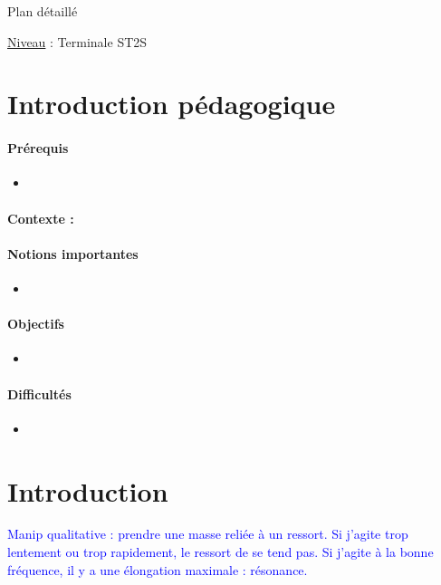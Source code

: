 \begin{reportBlock}{Plan détaillé}

\underline{Niveau} : Terminale ST2S \\

\section*{Introduction pédagogique}


\paragraph*{Prérequis}
\begin{itemize}
\item
\end{itemize}
\paragraph*{Contexte :}


\paragraph*{Notions importantes}

\begin{itemize}
\item 
\end{itemize}

\paragraph*{Objectifs}

\begin{itemize}
\item 
\end{itemize}

\paragraph*{Difficultés}

\begin{itemize}
\item 
\end{itemize}


\section*{Introduction }
\textcolor{blue}{Manip qualitative : prendre une masse reliée à un ressort. Si j'agite trop lentement ou trop rapidement, le ressort de se tend pas. Si j'agite à la bonne fréquence, il y a une élongation maximale : résonance.}


\end{reportBlock}
